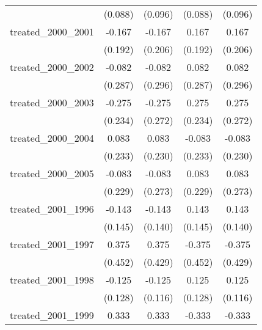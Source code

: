 {\begin{tabular}{l*{4}{c}}
            &     (0.088)         &     (0.096)         &     (0.088)         &     (0.096)         \\
[1em]
treated\_2000\_2001&      -0.167         &      -0.167         &       0.167         &       0.167         \\
            &     (0.192)         &     (0.206)         &     (0.192)         &     (0.206)         \\
[1em]
treated\_2000\_2002&      -0.082         &      -0.082         &       0.082         &       0.082         \\
            &     (0.287)         &     (0.296)         &     (0.287)         &     (0.296)         \\
[1em]
treated\_2000\_2003&      -0.275         &      -0.275         &       0.275         &       0.275         \\
            &     (0.234)         &     (0.272)         &     (0.234)         &     (0.272)         \\
[1em]
treated\_2000\_2004&       0.083         &       0.083         &      -0.083         &      -0.083         \\
            &     (0.233)         &     (0.230)         &     (0.233)         &     (0.230)         \\
[1em]
treated\_2000\_2005&      -0.083         &      -0.083         &       0.083         &       0.083         \\
            &     (0.229)         &     (0.273)         &     (0.229)         &     (0.273)         \\
[1em]
treated\_2001\_1996&      -0.143         &      -0.143         &       0.143         &       0.143         \\
            &     (0.145)         &     (0.140)         &     (0.145)         &     (0.140)         \\
[1em]
treated\_2001\_1997&       0.375         &       0.375         &      -0.375         &      -0.375         \\
            &     (0.452)         &     (0.429)         &     (0.452)         &     (0.429)         \\
[1em]
treated\_2001\_1998&      -0.125         &      -0.125         &       0.125         &       0.125         \\
            &     (0.128)         &     (0.116)         &     (0.128)         &     (0.116)         \\
[1em]
treated\_2001\_1999&       0.333         &       0.333         &      -0.333         &      -0.333         \\

\end{tabular}}

